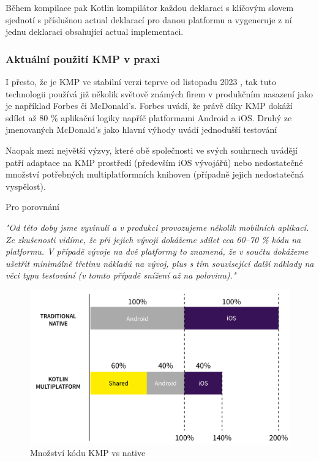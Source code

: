 Během kompilace pak Kotlin kompilátor každou deklaraci s klíčovým slovem  sjednotí s příslušnou actual deklarací pro danou platformu
a vygeneruje z ní jednu deklaraci obsahující actual implementaci. \cite{KMPExpectActual}

\subsubsection*{Aktuální použití KMP v praxi} \label{kmpInPractise}

I přesto, že je KMP ve stabilní verzi teprve od listopadu 2023 \cite{KMPstable}, tak tuto technologii používá již několik světově 
známých firem v produkčním nasazení jako je například Forbes či McDonald's. Forbes uvádí, že právě díky KMP dokáží sdílet až 80 \%
aplikační logiky napříč platformami Android a iOS. \cite{KMPinForbes} 
Druhý ze jmenovaných McDonald's jako hlavní výhody uvádí jednodušší testování \cite{KMPinMcDonalds}

Naopak mezi největší výzvy, které obě společnosti ve svých souhrnech uvádějí patří adaptace na KMP prostředí (především iOS vývojářů) nebo
nedostatečné množství potřebných multiplatformních knihoven (případně jejich nedostatečná vyspělost). \cite{KMPinForbes} \cite{KMPinMcDonalds}

Pro porovnání 

\emph{"Od této doby jsme vyvinuli a v produkci provozujeme několik mobilních aplikací. Ze zkušenosti vidíme, že při jejich vývoji dokážeme sdílet cca 60–70 \% kódu na platformu. V případě vývoje na dvě platformy to znamená, že v součtu dokážeme ušetřit minimálně třetinu nákladů na vývoj, plus s tím související další náklady na věci typu testování (v tomto případě snížení až na polovinu)."}

\begin{figure}[H]
  \centering
  \includegraphics[width=.7\textwidth]{chart-KMP-vs-native.png}
  \caption{Množství kódu KMP vs native}
  \label{fig:KMP_vs_native}
\end{figure}


